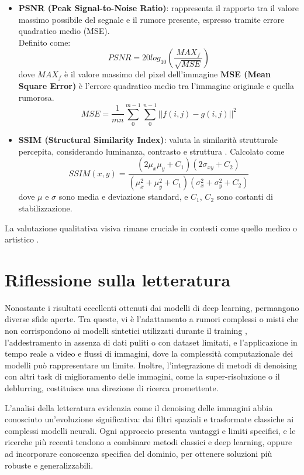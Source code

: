 \documentclass[12pt,a4paper,openright,twoside]{book}
\begin{document}
\begin{itemize}
    \item \textbf{PSNR (Peak Signal-to-Noise Ratio)}: rappresenta il rapporto tra il valore massimo possibile del segnale e il rumore presente\parencite{hore2010psnr}, espresso tramite errore quadratico medio (MSE).\\
    Definito come: \[PSNR=20log_{10}(\frac{MAX_f}{\sqrt{MSE}})\] dove $MAX_f$ è il valore massimo del pixel dell'immagine 
    \whiteline
    \textbf{MSE (Mean Square Error)} è l'errore quadratico medio tra l'immagine originale e quella rumorosa.\[MSE=\frac{1}{mn}\sum_{0}^{m-1}\sum_{0}^{n-1}||f(i,j)-g(i,j)||^2 \] 
    
    \item \textbf{SSIM (Structural Similarity Index)}: valuta la similarità strutturale percepita, considerando luminanza, contrasto e struttura \parencite{wang2004ssim}.
    Calcolato come \[SSIM(x,y) = \frac{(2\mu_x\mu_y + C_1)(2\sigma_{xy} + C_2)}{(\mu_x^2 + \mu_y^2 + C_1)(\sigma_x^2 + \sigma_y^2 + C_2)}\] dove $\mu$ e $\sigma$ sono media e deviazione standard, e $C_1$, $C_2$ sono costanti di stabilizzazione.
\end{itemize}
La valutazione qualitativa visiva rimane cruciale in contesti come quello medico o artistico \parencite{buades2005nonlocal, dabov2007bm3d}.

\section{Riflessione sulla letteratura}
Nonostante i risultati eccellenti ottenuti dai modelli di deep learning, permangono diverse sfide aperte. Tra queste, vi è l'adattamento a rumori complessi o misti che non corrispondono ai modelli sintetici utilizzati durante il training \parencite{wang2020_review, wang2020_review}, l'addestramento in assenza di dati puliti o con dataset limitati, e l'applicazione in tempo reale a video e flussi di immagini, dove la complessità computazionale dei modelli può rappresentare un limite. Inoltre, l'integrazione di metodi di denoising con altri task di miglioramento delle immagini, come la super-risoluzione o il deblurring, costituisce una direzione di ricerca promettente.

L'analisi della letteratura evidenzia come il denoising delle immagini abbia conosciuto un'evoluzione significativa: dai filtri spaziali e trasformate classiche ai complessi modelli neurali. Ogni approccio presenta vantaggi e limiti specifici, e le ricerche più recenti tendono a combinare metodi classici e deep learning, oppure ad incorporare conoscenza specifica del dominio, per ottenere soluzioni più robuste e generalizzabili.
\end{document}
